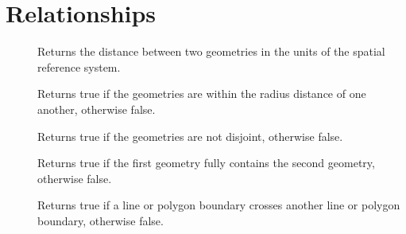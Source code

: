 \documentclass[a4paper,11pt,english]{sphinxmanual}
\begin{document}
\section{Relationships}
\label{\detokenize{postgis-functions:relationships}}\begin{description}
\item[{}] \leavevmode
Returns the distance between two geometries in the units of the spatial reference system.

\item[{}] \leavevmode
Returns true if the geometries are within the radius distance of one another, otherwise false.

\item[{}] \leavevmode
Returns true if the geometries are not disjoint, otherwise false.

\item[{}] \leavevmode
Returns true if the first geometry fully contains the second geometry, otherwise false.

\item[{}] \leavevmode
Returns true if a line or polygon boundary crosses another line or polygon boundary, otherwise false.

\end{description}
\end{document}
